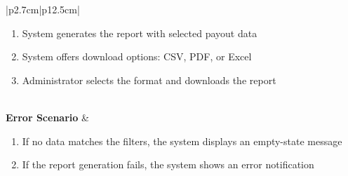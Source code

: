 \begin{table}[H]
\begin{tabular}{|p{2.7cm}|p{12.5cm}|}
\begin{minipage}[t]{\linewidth}
\begin{enumerate}[topsep=0pt,itemsep=1pt,parsep=0pt,partopsep=0pt]
                                          \item System generates the report with selected payout data
                                          \item System offers download options: CSV, PDF, or Excel
                                          \item Administrator selects the format and downloads the report
                                      \end{enumerate}
                                  \end{minipage} \\
        \hline
        \textbf{Error Scenario} & \begin{minipage}[t]{\linewidth}
                                      \begin{enumerate}[topsep=0pt,itemsep=1pt,parsep=0pt,partopsep=0pt]
                                          \item If no data matches the filters, the system displays an empty-state message
                                          \item If the report generation fails, the system shows an error notification
                                      \end{enumerate}
                                  \end{minipage} \\
        \hline
    \end{tabular}
    \label{tab:admin-export-payouts-report}
\end{table}
